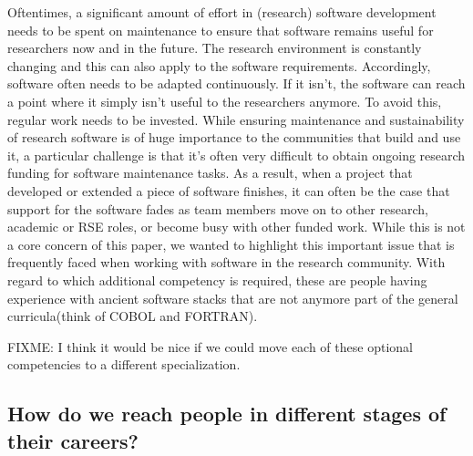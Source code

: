 \documentclass[a4paper
]{article}
\begin{document}
Oftentimes, a significant amount of effort in (research) software
development needs to be spent on maintenance to ensure that software
remains useful for researchers now and in the future. The research
environment is constantly changing and this can also apply to the
software requirements. Accordingly, software often needs to be adapted
continuously. If it isn't, the software can reach a point where it
simply isn't useful to the researchers anymore. To avoid this, regular
work needs to be invested. While ensuring maintenance and sustainability
of research software is of huge importance to the communities that build
and use it, a particular challenge is that it's often very difficult to
obtain ongoing research funding for software maintenance tasks. As a
result, when a project that developed or extended a piece of software
finishes, it can often be the case that support for the software fades
as team members move on to other research, academic or RSE roles, or
become busy with other funded work. While this is not a core concern of
this paper, we wanted to highlight this important issue that is
frequently faced when working with software in the research community.
With regard to which additional competency is required, these are people
having experience with ancient software stacks that are not anymore part
of the general curricula(think of COBOL and FORTRAN).

FIXME: I think it would be nice if we could move each of these optional
competencies to a different specialization.

\hypertarget{how-do-we-reach-people-in-different-stages-of-their-careers}{%
\subsection{How do we reach people in different stages of their
careers?}\label{how-do-we-reach-people-in-different-stages-of-their-careers}}
\end{document}
